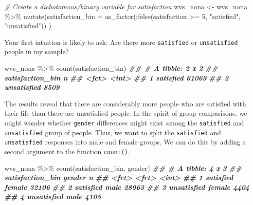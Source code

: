 \documentclass[
]{book}
\newenvironment{Shaded}{\begin{snugshade}}{\end{snugshade}}
\newcommand{\AttributeTok}[1]{\textcolor[rgb]{0.77,0.63,0.00}{#1}}
\newcommand{\CommentTok}[1]{\textcolor[rgb]{0.56,0.35,0.01}{\textit{#1}}}
\newcommand{\DecValTok}[1]{\textcolor[rgb]{0.00,0.00,0.81}{#1}}
\newcommand{\DocumentationTok}[1]{\textcolor[rgb]{0.56,0.35,0.01}{\textbf{\textit{#1}}}}
\newcommand{\FunctionTok}[1]{\textcolor[rgb]{0.00,0.00,0.00}{#1}}
\newcommand{\NormalTok}[1]{#1}
\newcommand{\OtherTok}[1]{\textcolor[rgb]{0.56,0.35,0.01}{#1}}
\newcommand{\SpecialCharTok}[1]{\textcolor[rgb]{0.00,0.00,0.00}{#1}}
\newcommand{\StringTok}[1]{\textcolor[rgb]{0.31,0.60,0.02}{#1}}
\begin{document}
\begin{Shaded}
\begin{Highlighting}[]
\CommentTok{\# Create a dichotomous/binary variable for satisfaction}
\NormalTok{wvs\_nona }\OtherTok{\textless{}{-}}\NormalTok{ wvs\_nona }\SpecialCharTok{\%\textgreater{}\%}
  \FunctionTok{mutate}\NormalTok{(}\AttributeTok{satisfaction\_bin =} \FunctionTok{as\_factor}\NormalTok{(}\FunctionTok{ifelse}\NormalTok{(satisfaction }\SpecialCharTok{\textgreater{}=} \DecValTok{5}\NormalTok{,}
                                             \StringTok{"satisfied"}\NormalTok{,}
                                             \StringTok{"unsatisfied"}\NormalTok{))}
\NormalTok{         )}
\end{Highlighting}
\end{Shaded}

Your first intuition is likely to ask: Are there more \texttt{satisfied} or \texttt{unsatisfied} people in my sample?

\begin{Shaded}
\begin{Highlighting}[]
\NormalTok{wvs\_nona }\SpecialCharTok{\%\textgreater{}\%} \FunctionTok{count}\NormalTok{(satisfaction\_bin)}
\DocumentationTok{\#\# \# A tibble: 2 x 2}
\DocumentationTok{\#\#   satisfaction\_bin     n}
\DocumentationTok{\#\#   \textless{}fct\textgreater{}            \textless{}int\textgreater{}}
\DocumentationTok{\#\# 1 satisfied        61069}
\DocumentationTok{\#\# 2 unsatisfied       8509}
\end{Highlighting}
\end{Shaded}

The results reveal that there are considerably more people who are satisfied with their life than there are unsatisfied people. In the spirit of group comparisons, we might wonder whether \texttt{gender} differences might exist among the \texttt{satisfied} and \texttt{unsatisfied} group of people. Thus, we want to split the \texttt{satisfied} and \texttt{unsatisfied} responses into male and female groups. We can do this by adding a second argument to the function \texttt{count()}.

\begin{Shaded}
\begin{Highlighting}[]
\NormalTok{wvs\_nona }\SpecialCharTok{\%\textgreater{}\%} \FunctionTok{count}\NormalTok{(satisfaction\_bin, gender)}
\DocumentationTok{\#\# \# A tibble: 4 x 3}
\DocumentationTok{\#\#   satisfaction\_bin gender     n}
\DocumentationTok{\#\#   \textless{}fct\textgreater{}            \textless{}fct\textgreater{}  \textless{}int\textgreater{}}
\DocumentationTok{\#\# 1 satisfied        female 32106}
\DocumentationTok{\#\# 2 satisfied        male   28963}
\DocumentationTok{\#\# 3 unsatisfied      female  4404}
\DocumentationTok{\#\# 4 unsatisfied      male    4105}
\end{Highlighting}
\end{Shaded}
\end{document}
